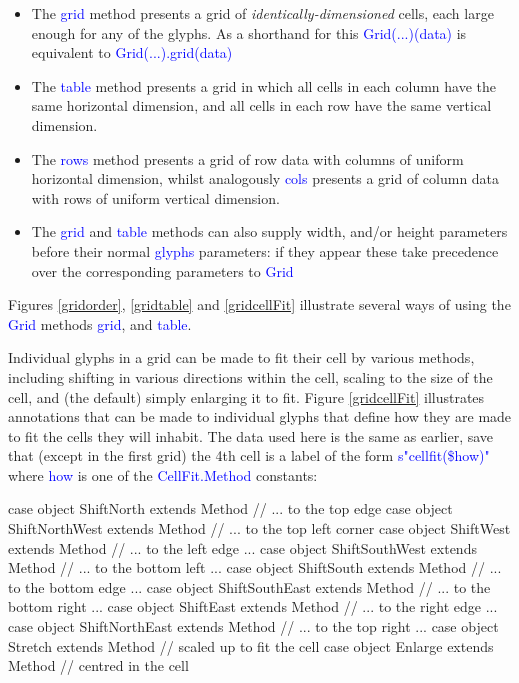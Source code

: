 \documentclass[12pt,a4paper]{article}
\def\Scala#1{\textcolor{blue}{\textsf{#1}}}
\begin{document}
\begin{itemize}
\item The \Scala{grid} method presents a grid of
\textit{identically-dimensioned} cells, each large enough for any
of the glyphs. As a shorthand for this \Scala{Grid(...)(data)} is
equivalent to \Scala{Grid(...).grid(data)}

\item The \Scala{table} method presents a grid in which all cells in each
column have the same horizontal dimension, and all cells in each
row have the same vertical dimension.

\item The \Scala{rows} method presents a grid of row data with columns of uniform horizontal dimension, whilst
analogously  \Scala{cols} presents a grid of column data with rows of uniform vertical dimension.

\item The \Scala{grid} and \Scala{table} methods can also supply width, and/or height parameters
      before their normal \Scala{glyphs} parameters: if they appear these take precedence over
      the corresponding parameters to \Scala{Grid}
\end{itemize}
Figures \ref{gridorder}, \ref{gridtable} and  \ref{gridcellFit} illustrate several ways of using
the \Scala{Grid} methods \Scala{grid}, and \Scala{table}. 




Individual glyphs in a grid can be made to fit their cell by
various methods, including shifting in various directions within the cell, scaling to
the size of the cell, and (the default) simply enlarging it to fit.
Figure \ref{gridcellFit} illustrates annotations that can be
made to individual glyphs that define how they are made to
fit the cells they will inhabit. The data used here is
the same as earlier, save that (except in the first grid) the 4th cell is a label of the form
\Scala{s"cellfit(\$how)"} where \Scala{how} is one of the \Scala{CellFit.Method}
constants:

\begin{scala}
case object ShiftNorth     extends Method // ... to the top edge
case object ShiftNorthWest extends Method // ... to the top left corner
case object ShiftWest      extends Method // ... to the left edge ...
case object ShiftSouthWest extends Method // ... to the bottom left  ...
case object ShiftSouth     extends Method // ... to the bottom edge ...
case object ShiftSouthEast extends Method // ... to the bottom right ...
case object ShiftEast      extends Method // ... to the right edge ...
case object ShiftNorthEast extends Method // ... to the top right ...
case object Stretch        extends Method // scaled up to fit the cell
case object Enlarge        extends Method // centred in the cell
\end{scala}
\end{document}
